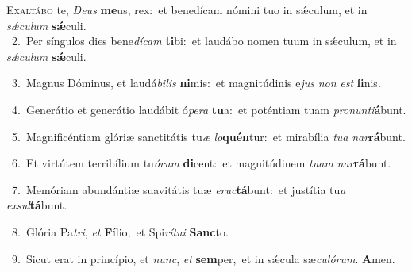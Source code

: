 \lettrine{\initial\textcolor{\initialcolor}{E}}{xaltábo} te, \textit{De}\-\textit{us} \textbf{me}\-us, rex:~\star et benedícam nómini tuo in sǽculum, et in \textit{sǽ}\-\textit{cu}\textit{lum} \textbf{sǽ}\-culi.\\
{\numbfont\textcolor{\numbcolor}{~2.}}~Per síngulos dies bene\-\textit{dí}\-\textit{cam} \textbf{ti}\-bi:~\star et laudábo nomen tuum in sǽculum, et in \textit{sǽ}\-\textit{cu}\textit{lum} \textbf{sǽ}\-culi.\par
{\numbfont\textcolor{\numbcolor}{~3.}}~Magnus Dóminus, et laudá\-\textit{bi}\-\textit{lis} \textbf{ni}\-mis:~\star et magnitúdinis e\textit{jus} \textit{non} \textit{est} \textbf{fi}\-nis.\par
{\numbfont\textcolor{\numbcolor}{~4.}}~Generátio et generátio laudábit ó\-\textit{pe}\-\textit{ra} \textbf{tu}\-a:~\star et poténtiam tuam \textit{pro}\-\textit{nun}\textit{ti}\textbf{á}bunt.\par
{\numbfont\textcolor{\numbcolor}{~5.}}~Magnificéntiam glóriæ sanctitátis tu\textit{æ} \textit{lo}\-\textbf{quén}tur:~\star et mirabília \textit{tu}\-\textit{a} \textit{nar}\-\textbf{rá}bunt.\par
{\numbfont\textcolor{\numbcolor}{~6.}}~Et virtútem terribílium tu\-\textit{ó}\-\textit{rum} \textbf{di}\-cent:~\star et magnitúdinem \textit{tu}\-\textit{am} \textit{nar}\-\textbf{rá}bunt.\par
{\numbfont\textcolor{\numbcolor}{~7.}}~Memóriam abundántiæ suavitátis tuæ \textit{e}\-\textit{ruc}\textbf{tá}bunt:~\star et justítia tu\textit{a} \textit{ex}\-\textit{sul}\textbf{tá}bunt.\par
{\numbfont\textcolor{\numbcolor}{~8.}}~Glória Pa\-\textit{tri}\-, \textit{et} \textbf{Fí}\-lio,~\star et Spi\-\textit{rí}\-\textit{tu}\textit{i} \textbf{Sanc}\-to.\par
{\numbfont\textcolor{\numbcolor}{~9.}}~Sicut erat in princípio, et \textit{nunc}\-, \textit{et} \textbf{sem}\-per,~\star et in sǽcula sæ\-\textit{cu}\-\textit{ló}\textit{rum}. \textbf{A}\-men.\par
